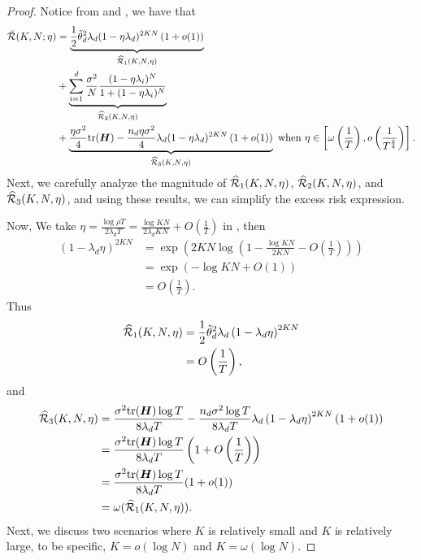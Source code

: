 \begin{proof}
    Notice from  and , we have that
\begin{align*}
    \Bar{\mathcal{R}}(K, N;\eta)&= \underbrace{\frac{1}{2}\Tilde{\theta}_d^2 \lambda_d (1-\eta\lambda_d)^{2KN}\left(1+o(1)\right)}_{\widehat{\mathcal{R}}_1(K,N, \eta)} \\    &+\underbrace{\sum_{i=1}^d\frac{\sigma^2}{N}\frac{(1-\eta\lambda_i)^N}{1+ (1-\eta\lambda_i)^N}}_{\widehat{\mathcal{R}}_2(K,N, \eta)} \\
    &+ \underbrace{\frac{\eta \sigma^2}{4} \mathrm{tr}({\bm{H}})- \frac{n_d\eta\sigma^2}{4}\lambda_d(1-\eta\lambda_d)^{2KN}\left(1+o(1)\right)}_{\widehat{\mathcal{R}}_3(K,N, \eta)} ~\text{when} ~\eta \in \left[\omega\left(\frac{1}{T}\right), o\left(\frac{1}{T^{\frac{3}{4}}}\right)\right].
\end{align*}
Next, we carefully analyze the magnitude of $\widehat{\mathcal{R}}_1(K,N, \eta)$, $\widehat{\mathcal{R}}_2(K,N, \eta)$, and $\widehat{\mathcal{R}}_3(K,N, \eta)$, and using these results, we can simplify the excess risk expression.  

Now, We take $\eta = \frac{\log  \rho T}{2\lambda_d T}=\frac{\log KN}{2\lambda_d KN}+O\left(\frac{1}{T}\right)$ in , then
\begin{align*}
    \left(1-\lambda_d\eta\right)^{2KN}&=\exp\left({2KN\log\left(1-\frac{\log KN}{2KN}-O\left(\frac{1}{T}\right)\right)}\right) \\
    &=\exp\left(-\log KN+O(1)\right) \\
    &=O\left(\frac{1}{T}\right).
\end{align*}
Thus
\begin{align*}
    \widehat{\mathcal{R}}_1(K,N, \eta)&=\frac{1}{2}\Tilde{\theta}_d^2 \lambda_d \left(1-\lambda_d\eta\right)^{2KN} \\
    &=O\left(\frac{1}{T}\right), \\ 
\end{align*}
and
\begin{align*}
    \widehat{\mathcal{R}}_3(K,N, \eta) &= \frac{\sigma^2\mathrm{tr}({\bm{H}})\log T}{8\lambda_d T}-\frac{n_d\sigma^2\log T}{8\lambda_d T}\lambda_d\left(1-\lambda_d\eta\right)^{2KN}(1+o(1)) \\   &=\frac{\sigma^2\mathrm{tr}({\bm{H}})\log T}{8\lambda_d T}\left(1+O\left(\frac{1}{T}\right)\right) \\    &=\frac{\sigma^2\mathrm{tr}({\bm{H}})\log T}{8\lambda_d T}(1+o(1)) \\
    &=\omega(\widehat{\mathcal{R}}_1(K,N, \eta)).
\end{align*}
Next, we discuss two scenarios where $K$ is relatively small and $K$ is relatively large, to be specific, $K = o(\log N)$ and $K = \omega(\log N)$.


\end{proof}
